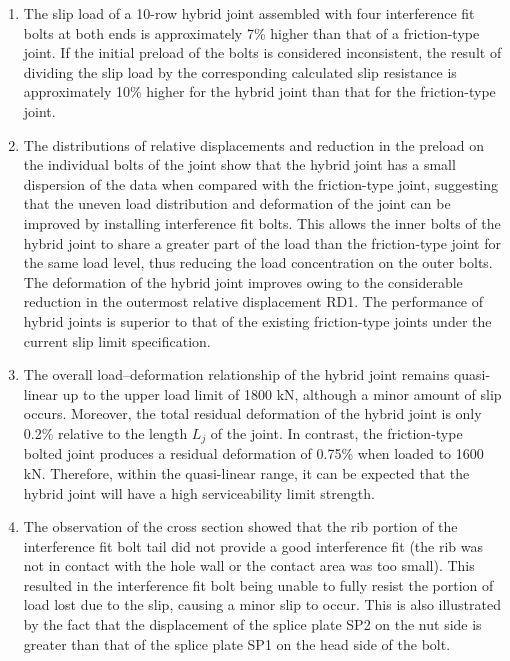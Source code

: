\begin{enumerate}

\item The slip load of a 10-row hybrid joint assembled with four interference fit bolts at both ends is approximately 7\% higher than that of a friction-type joint. If the initial preload of the bolts is considered inconsistent, the result of dividing the slip load by the corresponding calculated slip resistance is approximately 10\% higher for the hybrid joint than that for the friction-type joint.

\item The distributions of relative displacements and reduction in the preload on the individual bolts of the joint show that the hybrid joint has a small dispersion of the data when compared with the friction-type joint, suggesting that the uneven load distribution and deformation of the joint can be improved by installing interference fit bolts. This allows the inner bolts of the hybrid joint to share a greater part of the load than the friction-type joint for the same load level, thus reducing the load concentration on the outer bolts. The deformation of the hybrid joint improves owing to the considerable reduction in the outermost relative displacement RD1. The performance of hybrid joints is superior to that of the existing friction-type joints under the current slip limit specification. 

\item The overall load--deformation relationship of the hybrid joint remains quasi-linear up to the upper load limit of 1800 kN, although a minor amount of slip occurs. Moreover, the total residual deformation of the hybrid joint is only 0.2\% relative to the length $L_j$ of the joint. In contrast, the friction-type bolted joint produces a residual deformation of 0.75\% when loaded to 1600 kN. Therefore, within the quasi-linear range, it can be expected that the hybrid joint will have a high serviceability limit strength.

\item The observation of the cross section showed that the rib portion of the interference fit bolt tail did not provide a good interference fit (the rib was not in contact with the hole wall or the contact area was too small). This resulted in the interference fit bolt being unable to fully resist the portion of load lost due to the slip, causing a minor slip to occur. This is also illustrated by the fact that the displacement of the splice plate SP2 on the nut side is greater than that of the splice plate SP1 on the head side of the bolt.


\end{enumerate}